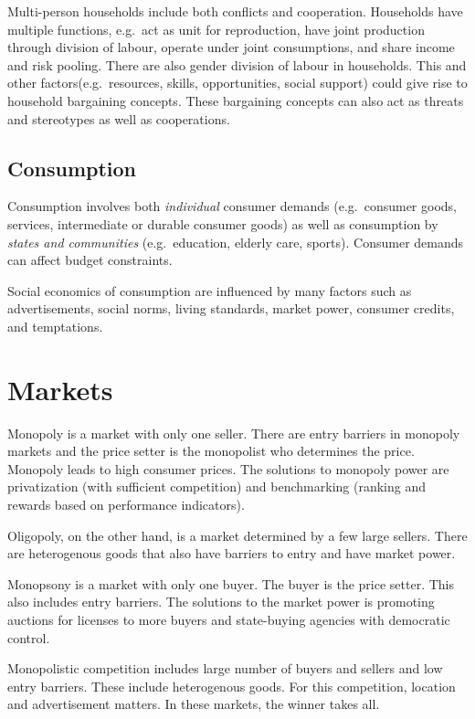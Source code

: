 \documentclass[
]{book}
\begin{document}
Multi-person households include both conflicts and cooperation. Households have multiple functions, e.g.~act as unit for reproduction, have joint production through division of labour, operate under joint consumptions, and share income and risk pooling.
There are also gender division of labour in households. This and other factors(e.g.~resources, skills, opportunities, social support) could give rise to household bargaining concepts. These bargaining concepts can also act as threats and stereotypes as well as cooperations.

\hypertarget{consumption}{%
\section{Consumption}\label{consumption}}

Consumption involves both \emph{individual} consumer demands (e.g.~consumer goods, services, intermediate or durable consumer goods) as well as consumption by \emph{states and communities} (e.g.~education, elderly care, sports).
Consumer demands can affect budget constraints.

Social economics of consumption are influenced by many factors such as advertisements, social norms, living standards, market power, consumer credits, and temptations.

\hypertarget{markets}{%
\chapter{Markets}\label{markets}}

Monopoly is a market with only one seller. There are entry barriers in monopoly markets and the price setter is the monopolist who determines the price. Monopoly leads to high consumer prices.
The solutions to monopoly power are privatization (with sufficient competition) and benchmarking (ranking and rewards based on performance indicators).

Oligopoly, on the other hand, is a market determined by a few large sellers. There are heterogenous goods that also have barriers to entry and have market power.

Monopsony is a market with only one buyer. The buyer is the price setter. This also includes entry barriers.
The solutions to the market power is promoting auctions for licenses to more buyers and state-buying agencies with democratic control.

Monopolistic competition includes large number of buyers and sellers and low entry barriers. These include heterogenous goods. For this competition, location and advertisement matters. In these markets, the winner takes all.
\end{document}
